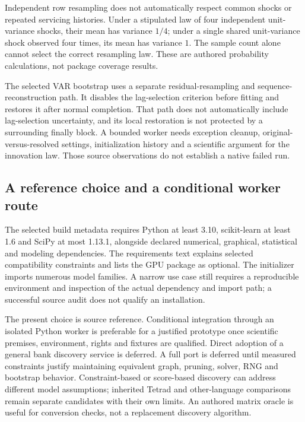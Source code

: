 Independent row resampling does not automatically respect common shocks
or repeated servicing histories. Under a stipulated law of four independent
unit-variance shocks, their mean has variance $1/4$; under a single shared
unit-variance shock observed four times, its mean has variance $1$.
The sample count alone cannot select the correct resampling law.
These are authored probability calculations, not package coverage results.
\citep{exec24_lingam_choice}

The selected VAR bootstrap uses a separate residual-resampling and
sequence-reconstruction path. It disables the lag-selection criterion
before fitting and restores it after normal completion. That path does
not automatically include lag-selection uncertainty, and its local
restoration is not protected by a surrounding finally block. A bounded
worker needs exception cleanup, original-versus-resolved settings,
initialization history and a scientific argument for the innovation law.
Those source observations do not establish a native failed run.
\citep{exec24_lingam_source}

\subsection{A reference choice and a conditional worker route}
The selected build metadata requires Python at least 3.10, scikit-learn
at least 1.6 and SciPy at most 1.13.1, alongside declared numerical,
graphical, statistical and modeling dependencies. The requirements text
explains selected compatibility constraints and lists the GPU package as
optional. The initializer imports numerous model families. A narrow use
case still requires a reproducible environment and inspection of the
actual dependency and import path; a successful source audit does not
qualify an installation.\citep{exec24_lingam_source}

The present choice is source reference. Conditional integration through
an isolated Python worker is preferable for a justified prototype once
scientific premises, environment, rights and fixtures are qualified.
Direct adoption of a general bank discovery service is deferred. A full
port is deferred until measured constraints justify maintaining equivalent
graph, pruning, solver, RNG and bootstrap behavior. Constraint-based or
score-based discovery can address different model assumptions; inherited
Tetrad and other-language comparisons remain separate candidates with
their own limits. An authored matrix oracle is useful for conversion
checks, not a replacement discovery algorithm.
\citep{exec24_lingam_choice}

